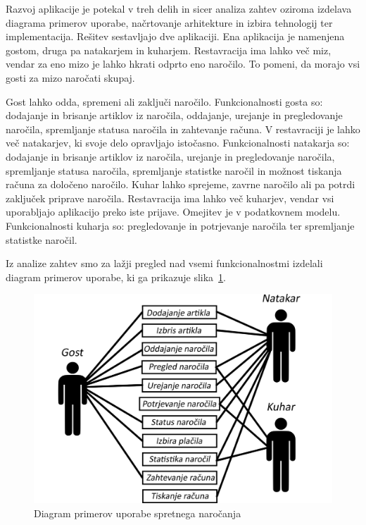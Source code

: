 \documentclass[a4paper, 12pt]{book}
\begin{document}
Razvoj aplikacije je potekal v treh delih in sicer analiza zahtev oziroma izdelava diagrama primerov uporabe, načrtovanje arhitekture in izbira tehnologij ter implementacija.
Rešitev sestavljajo dve aplikaciji. Ena aplikacija je namenjena gostom, druga pa natakarjem in kuharjem. Restavracija ima lahko več miz, vendar za eno mizo je lahko hkrati odprto eno naročilo. To pomeni, da morajo vsi gosti za mizo naročati skupaj. 

Gost lahko odda, spremeni ali zaključi naročilo. Funkcionalnosti gosta so: dodajanje in brisanje artiklov iz naročila, oddajanje, urejanje in pregledovanje naročila, spremljanje statusa naročila in zahtevanje računa. V restavraciji je lahko več natakarjev, ki svoje delo opravljajo istočasno. Funkcionalnosti natakarja so: dodajanje in brisanje artiklov iz naročila, urejanje in pregledovanje naročila, spremljanje statusa naročila, spremljanje statistke naročil in možnost tiskanja računa za določeno naročilo. Kuhar lahko sprejeme, zavrne naročilo ali pa potrdi zaključek priprave naročila. Restavracija ima lahko več kuharjev, vendar vsi uporabljajo aplikacijo preko iste prijave. Omejitev je v podatkovnem modelu. Funkcionalnosti kuharja so: pregledovanje in potrjevanje naročila ter spremljanje statistke naročil.

Iz analize zahtev smo za lažji pregled nad vsemi funkcionalnostmi izdelali diagram primerov uporabe, ki ga prikazuje slika~\ref{FunkVloge}.

\begin{figure}[!htb]
\begin{center}
\includegraphics[width=11.5cm]{Skica2.png}
\caption{Diagram primerov uporabe spretnega naročanja}
\label{FunkVloge}
\end{center}
\end{figure}
\end{document}

